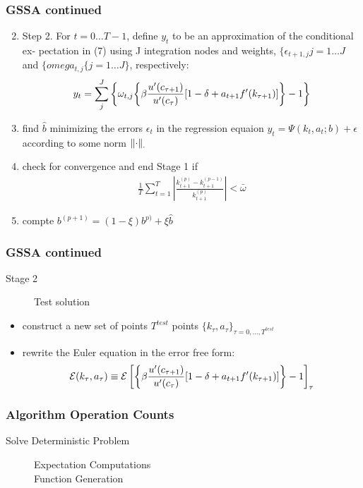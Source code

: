 \documentclass[tikz]{beamer}
\begin{document}
 \begin{frame}
   \frametitle{GSSA continued}

{\small
   \begin{enumerate}
\setcounter{enumi}{1}
 \item  Step 2. For $t = 0\ldots T − 1$, define $y_t$ to be an approximation of the conditional ex- pectation in (7) using J integration nodes and weights, $\{\epsilon_{t+1,j}j=1\ldots J$ and $\{omega_{t,j}\{j=1\ldots J\}$, respectively:
   \begin{gather}
     y_t=\sum_j^J \left \{ \omega_{t,j}  {\left \{ \beta \frac{u^\prime(c_{\tau+1})}{u^\prime(c_{\tau})} [1- \delta + a_{t+1}f^\prime(k_{\tau+1})] \right \} -1} \right \}
   \end{gather}
 \item find $\hat{b}$ minimizing the errors $\epsilon_t$ in the regression equaion $ y_{t}=\Psi(k_t,a_t;b) + \epsilon$ according to some norm $\left\lVert\cdot\right\rVert_\cdot$
\item check for convergence and end Stage 1 if
  \begin{gather}
    \frac{1}{T}\sum_{t=1}^T \left | \frac{k_{t+1}^{(p)}-k_{t+1}^{(p-1)}}{k_{t+1}^{(p)}} \right | < \bar{\omega}
  \end{gather}
 \item compte $b^{(p+1)}= (1-\xi)b^{p)} + \xi \hat{b}$
   \end{enumerate}
}
 \end{frame}


 \begin{frame}
   \frametitle{GSSA continued}

{\small
   \begin{description}
\item[Stage 2]  Test solution
   \end{description}
   \begin{itemize}
\item construct a new set of points $T^{test}$ points $\{k_\tau,a_\tau\}_{\tau=0, \ldots, T^{test}}$
    \item rewrite the Euler equation in the error free form:
      \begin{gather}
        \mathcal{E}(k_\tau,a_\tau)\equiv {\mathcal{E}\left [ 
{\left \{ \beta \frac{u^\prime(c_{\tau+1})}{u^\prime(c_{\tau})} [1- \delta + a_{t+1}f^\prime(k_{\tau+1})] \right \} -1}\right ]}_\tau 
      \end{gather}
   \end{itemize}
}
 \end{frame}

\begin{frame}
  \frametitle{Algorithm Operation Counts}
  \begin{description}
  \item[Solve Deterministic Problem]
    \begin{description}
    \item[Expectation Computations] 
    \item[Function Generation] 
    \end{description}
  \end{description}
\end{frame}
\end{document}
